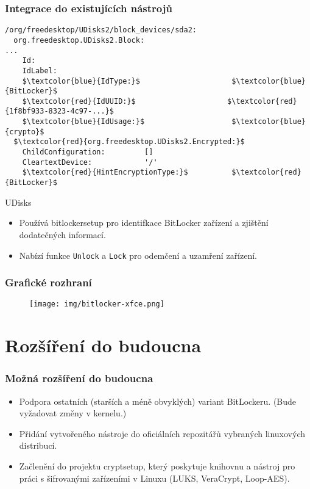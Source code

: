 \documentclass{beamer}
\begin{document}
\begin{frame}[fragile]
	\frametitle{Integrace do existujících nástrojů}

	\begin{lstlisting}[frame=none, escapechar=$, basicstyle=\ttfamily\small, columns=fullflexible, keepspaces=true]
/org/freedesktop/UDisks2/block_devices/sda2:
  org.freedesktop.UDisks2.Block:
...
    Id:
    IdLabel:
    $\textcolor{blue}{IdType:}$                     $\textcolor{blue}{BitLocker}$
    $\textcolor{red}{IdUUID:}$                     $\textcolor{red}{1f8bf933-8323-4c97-...}$
    $\textcolor{blue}{IdUsage:}$                    $\textcolor{blue}{crypto}$
  $\textcolor{red}{org.freedesktop.UDisks2.Encrypted:}$
    ChildConfiguration:         []
    CleartextDevice:            '/'
    $\textcolor{red}{HintEncryptionType:}$          $\textcolor{red}{BitLocker}$
\end{lstlisting}

\begin{block}{UDisks}
	\begin{itemize}
		\item Používá bitlockersetup pro identifkace BitLocker zařízení a zjištění dodatečných informací.
		\item Nabízí funkce \texttt{Unlock} a \texttt{Lock} pro odemčení a uzamření zařízení.
	\end{itemize}
\end{block}

\end{frame}

\begin{frame}
	\frametitle{Grafické rozhraní}

\begin{figure}[ht!]
	\begin{center}
  	  \texttt{[image: img/bitlocker-xfce.png]}
	\end{center}
	\end{figure}
\end{frame}


\section{Rozšíření do budoucna}

\begin{frame}
  \frametitle{Možná rozšíření do budoucna}
	\begin{block}{}
		\begin{itemize}
			\item Podpora ostatních (starších a méně obvyklých) variant BitLockeru. (Bude vyžadovat změny v kernelu.)
			\item Přidání vytvořeného nástroje do oficiálních repozitářů vybraných linuxových distribucí.
			\item Začlenění do projektu cryptsetup, který poskytuje knihovnu a nástroj pro práci s šifrovanými zařízeními v Linuxu (LUKS, VeraCrypt, Loop-AES).
		\end{itemize}
	\end{block}

\end{frame}
\end{document}
